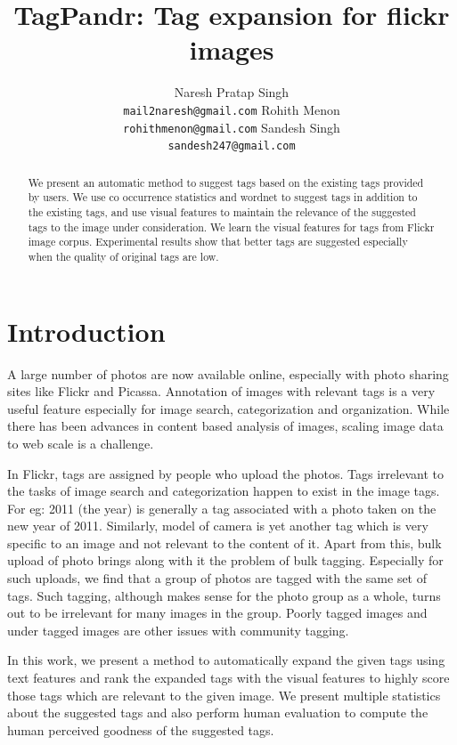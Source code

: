 \documentclass[12pt]{article}
\title{TagPandr: Tag expansion for flickr images}
\author{Naresh Pratap Singh\\
  {\tt mail2naresh@gmail.com}  \And
  Rohith Menon\\
  {\tt rohithmenon@gmail.com} \And
  Sandesh Singh\\
  {\tt sandesh247@gmail.com}
  }
\date{}
\begin{document}
\maketitle
\begin{abstract}
We present an automatic method to suggest tags based on the existing tags provided by
users. We use co occurrence statistics and wordnet to suggest tags in addition
to the existing tags, and use visual features to maintain the relevance of
the suggested tags to the image under consideration. We learn the visual features
for tags from Flickr image corpus. Experimental results show that better tags
  are suggested especially when the quality of original tags are low.
\end{abstract}

\section{Introduction}

A large number of photos are now available online, especially with photo sharing sites like
Flickr and Picassa. Annotation of images with relevant tags is a very useful feature especially
for image search, categorization and organization. While there has been advances in content
based analysis of images, scaling image data to web scale is a challenge.

In Flickr, tags are assigned by people who upload the photos. Tags irrelevant to the tasks of
image search and categorization happen to exist in the image tags. For eg: 2011 (the year) is generally
a tag associated with a photo taken on the new year of 2011. Similarly, model of camera is yet
another tag which is very specific to an image and not relevant to the content of it. Apart from
this, bulk upload of photo brings along with it the problem of bulk tagging. Especially for such
uploads, we find that a group of photos are tagged with the same set of tags. Such tagging, although
makes sense for the photo group as a whole, turns out to be irrelevant for many images in the group.
Poorly tagged images and under tagged images are other issues with community tagging.

In this work, we present a method to automatically expand the given tags using text features and
rank the expanded tags with the visual features to highly score those tags which are relevant to
the given image. We present multiple statistics about the suggested tags and also perform human
evaluation to compute the human perceived goodness of the suggested tags.
\end{document}
